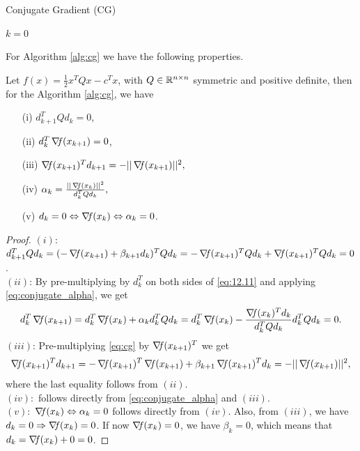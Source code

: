 \documentclass[10pt,a4paper]{article}
\begin{document}
\begin{algorithm}[H]\label{alg:cg}
	\caption{Conjugate Gradient (CG)}
	
	
	$k = 0$
	
\end{algorithm}


\noindent For Algorithm \ref{alg:cg} we have the following properties.
\begin{lemma}\label{lemma:cg}
	Let $f(x) =\frac{1}{2}x^TQx -c^Tx$, with $Q\in \mathbb{R}^{n\times n}$ symmetric and positive definite, then for the Algorithm \ref{alg:cg}, we have 
	\begin{enumerate}
		\item[(i)] $d_{k+1}^TQd_k =0$,
		\item[(ii)] $d_k^T\operatorname*{\mathit{\nabla \!f}}(x_{k+1})=0$,
		\item[(iii)]$\operatorname*{\mathit{\nabla \!f}}(x_{k+1})^Td_{k+1} = -||\operatorname*{\mathit{\nabla \!f}}(x_{k+1})||^2,$
		\item[(iv)] $\alpha_k = \frac{||\operatorname*{\mathit{\nabla \!f}} (x_k)||^2}{d_k^T Q d_k},$
		\item[(v)] $d_k = 0 \Leftrightarrow \operatorname*{\mathit{\nabla \!f}}(x_k)\Leftrightarrow \alpha_k=0$.
	\end{enumerate}
\end{lemma}
\begin{proof}
	$(i)$: $d_{k+1}^TQd_k = (-\operatorname*{\mathit{\nabla \!f}}(x_{k+1}) +\beta_{k+1} d_k)^T Qd_k = -\operatorname*{\mathit{\nabla \!f}}(x_{k+1})^TQd_k + \operatorname*{\mathit{\nabla \!f}}(x_{k+1})^TQd_k = 0$. \\
	$(ii)$: By pre-multiplying by $d_k^T$ on both sides of \eqref{eq:12.11} and applying \eqref{eq:conjugate_alpha}, we get 
$$d_k^T\operatorname*{\mathit{\nabla \!f}}(x_{k+1}) = d_k^T\operatorname*{\mathit{\nabla \!f}}(x_k) + \alpha_k d_k^TQ d_k = d_k^T\operatorname*{\mathit{\nabla \!f}}(x_k) -\frac{\operatorname*{\mathit{\nabla \!f}} (x_k)^T d_k}{d_k^T Q d_k} d_k^TQ d_k=0.$$
$(iii)$: Pre-multiplying \eqref{eq:cg} by $\operatorname*{\mathit{\nabla \!f}}(x_{k+1})^T$ we get
$$\operatorname*{\mathit{\nabla \!f}}(x_{k+1})^Td_{k+1} = -\operatorname*{\mathit{\nabla \!f}}(x_{k+1})^T\operatorname*{\mathit{\nabla \!f}}(x_{k+1}) +\beta_{k+1} \operatorname*{\mathit{\nabla \!f}}(x_{k+1})^Td_k=-||\operatorname*{\mathit{\nabla \!f}}(x_{k+1})||^2,$$
where the last equality follows from $(ii)$.\\
$(iv):$ follows directly from \eqref{eq:conjugate_alpha} and $(iii)$.\\
$(v):$ $\operatorname*{\mathit{\nabla \!f}}(x_k)\Leftrightarrow \alpha_k=0$ follows directly from $(iv)$. Also, from $(iii)$, we have $d_k=0\Rightarrow \operatorname*{\mathit{\nabla \!f}}(x_k)=0$. If now $\operatorname*{\mathit{\nabla \!f}}(x_k)=0$, we have $\beta_k = 0$, which means that $d_k=\operatorname*{\mathit{\nabla \!f}}(x_k)+ 0 =0$.
\end{proof} 
\end{document}

